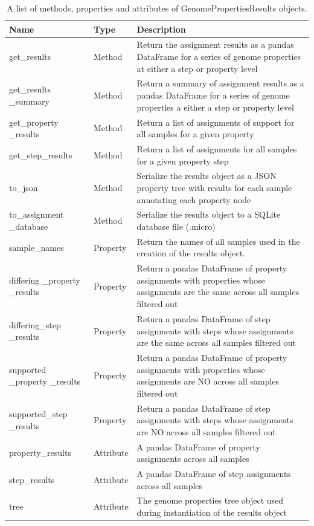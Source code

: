 \begin{longtable}{|p{2.7cm}|p{2cm}|p{10cm}|}
\caption{A list of methods, properties and attributes of GenomePropertiesResults objects.}
\label{tab:results-object}\\
\hline
\textbf{Name} & \textbf{Type} & \textbf{Description} \\ \hline
\endfirsthead
%
\endhead
%
get\_results & Method & Return the assignment results as a pandas DataFrame for a series of genome properties at either a step or property level \\ \hline
get\_results \_summary & Method & Return a summary of assignment results as a pandas DataFrame for a series of genome properties a either a step or property level \\ \hline
get\_property \_results & Method & Return a list of assignments of support for all samples for a given property \\ \hline
get\_step\_results & Method & Return a list of assignments for all samples for a given property step \\ \hline
to\_json & Method & Serialize the results object as a JSON property tree with results for each sample annotating each property node \\ \hline
to\_assignment \_database & Method & Serialize the results object to a SQLite database file (.micro) \\ \hline
sample\_names & Property & Return the names of all samples used in the creation of the results object. \\ \hline
differing \_property \_results & Property & Return a pandas DataFrame of property assignments with properties whose assignments are the same across all samples filtered out \\ \hline
differing\_step \_results & Property & Return a pandas DataFrame of step assignments with steps whose assignments are the same across all samples filtered out \\ \hline
supported \_property \_results & Property & Return a pandas DataFrame of property assignments with properties whose assignments are NO across all samples filtered out \\ \hline
supported\_step \_results & Property & Return a pandas DataFrame of step assignments with steps whose assignments are NO across all samples filtered out \\ \hline
property\_results & Attribute & A pandas DataFrame of property assignments across all samples \\ \hline
step\_results & Attribute & A pandas DataFrame of step assignments across all samples \\ \hline
tree & Attribute & The genome properties tree object used during instantiation of the results object \\ \hline
\end{longtable}


